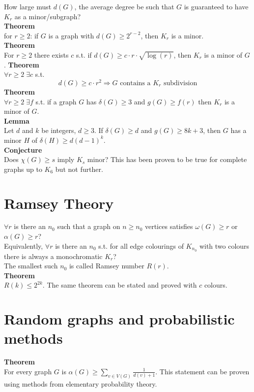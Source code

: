 \documentclass[a4paper, 12pt]{article}
\begin{document}
	How large must $d(G)$, the average degree be such that $G$ is guaranteed to have $K_r$ as a minor/subgraph?\\
	\textbf{Theorem}\\
	for $r \geq 2$: if $G$ is a graph with $d(G) \geq 2^{r-2}$, then $K_r$ is a minor.\\
	\textbf{Theorem}\\
	For $r \geq 2$ there exists $c$ s.t. if $d(G) \geq c\cdot r \cdot \sqrt{\log(r)}$, then $K_r$ is a minor of $G$.
	\noindent\textbf{Theorem}\\
	$\forall r \geq 2 \; \exists c$ s.t. \[d(G) \geq c\cdot r^2 \Rightarrow G \text{ contains a $K_r$ subdivision}\]
	\textbf{Theorem}\\
	$\forall r \geq 2 \; \exists f$ s.t. if a graph $G$ has $\delta(G) \geq 3$ and $g(G) \geq f(r)$ then $K_r$ is a minor of $G$.\\
	\textbf{Lemma}\\
	Let $d$ and $k$ be integers, $d \geq 3$. If $\delta(G) \geq d$ and $g(G) \geq 8k+3$, then $G$ has a minor $H$ of $\delta(H) \geq d(d-1)^k$.\\
	\textbf{Conjecture}\\
	Does $\chi(G) \geq s$ imply $K_s$ minor?
	This has been proven to be true for complete graphs up to $K_6$ but not further.
	
	\section{Ramsey Theory}
	$\forall r$ is there an $n_0$ such that a graph on $n \geq n_0$ vertices satisfies $\omega(G) \geq r$ or $\alpha(G) \geq r$?\\
	Equivalently, $\forall r$ is there an $n_0$ s.t. for all edge colourings of $K_{n_0}$ with two colours there is always a monochromatic $K_r$?\\
	The smallest such $n_0$ is called Ramsey number $R(r)$.\\
	\textbf{Theorem}\\
	$R(k) \leq 2^{2k}$. 
	The same theorem can be stated and proved with $c$ colours.
	
	\section{Random graphs and probabilistic methods}
	\textbf{Theorem}\\
	For every graph $G$ is $\alpha(G) \geq \sum_{v \in V(G)} \frac{1}{d(v)+1}$. This statement can be proven using methods from elementary probability theory.\\
	
\end{document}
